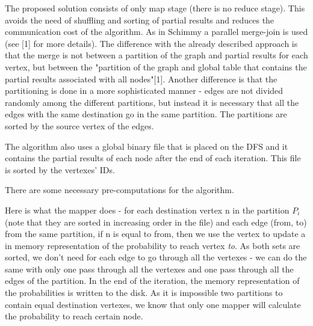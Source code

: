\documentclass[12pt]{article}
\theoremstyle{plain}
\begin{document}
  The proposed solution consists of only map stage (there is no reduce stage). 
  This avoids the need of shuffling and sorting of partial results and reduces
  the communication cost of the algorithm. As in Schimmy a parallel merge-join
  is used (see [1] for more details). The difference with the already described
  approach is that the merge is not between a partition of the graph and 
  partial results for each vertex, but between the "partition of the graph and 
  global table that contains the partial results associated with all nodes"[1].
  Another difference is that the partitioning is done in a more sophisticated 
  manner - edges are not divided randomly among the different partitions, but
  instead it is necessary that all the edges with the same destination go in 
  the same partition. The partitions are sorted by the source vertex of the 
  edges. 

  The algorithm also uses a global binary file that is placed on the DFS and it
  contains the partial results of each node after the end of each iteration. 
  This file is sorted by the vertexes' IDs.

  There are some necessary pre-computations for the algorithm.

  Here is what the mapper does - for each destination vertex n in the partition
  $P_i$ (note that they are sorted in increasing order in the file) and each
  edge (from, to) from the same partition, if n is equal to from, then we use
  the vertex to update a in memory representation of the probability to reach
  vertex \emph{to}. As both sets are sorted, we don't need for each edge to go 
  through all the vertexes - we can do the same with only one pass through 
  all the vertexes and one pass through all the edges of the partition. In the
  end of the iteration, the memory representation of the probabilities is 
  written to the disk. As it is impossible two partitions to contain equal 
  destination vertexes, we know that only one mapper will calculate the 
  probability to reach certain node.
\end{document}
